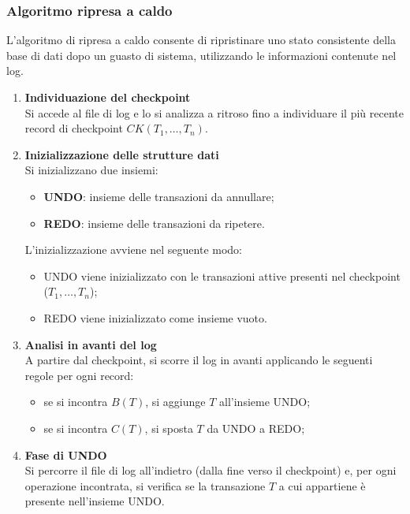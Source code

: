 \subsubsection{Algoritmo ripresa a caldo}

L'algoritmo di ripresa a caldo consente di ripristinare uno stato consistente della base di dati dopo un guasto di sistema, utilizzando le informazioni contenute nel log.

\begin{enumerate}
	\item \textbf{Individuazione del checkpoint} \\
	Si accede al file di log e lo si analizza a ritroso fino a individuare il più recente record di checkpoint $CK(T_1, \dots, T_n)$.
	
	\item \textbf{Inizializzazione delle strutture dati} \\
	Si inizializzano due insiemi:
	\begin{itemize}
		\item \textbf{UNDO}: insieme delle transazioni da annullare;
		\item \textbf{REDO}: insieme delle transazioni da ripetere.
	\end{itemize}
	
	L'inizializzazione avviene nel seguente modo:
	\begin{itemize}
		\item UNDO viene inizializzato con le transazioni attive presenti nel checkpoint ($T_1, \dots, T_n$);
		\item REDO viene inizializzato come insieme vuoto.
	\end{itemize}
	
	\item \textbf{Analisi in avanti del log} \\
	A partire dal checkpoint, si scorre il log in avanti applicando le seguenti regole per ogni record:
	\begin{itemize}
		\item se si incontra $B(T)$, si aggiunge $T$ all'insieme UNDO;
		\item se si incontra $C(T)$, si sposta $T$ da UNDO a REDO;
	\end{itemize}
	
\item \textbf{Fase di UNDO} \\
Si percorre il file di log all'indietro (dalla fine verso il checkpoint) e, per ogni operazione incontrata, si verifica se la transazione $T$ a cui appartiene è presente nell'insieme UNDO.


\end{enumerate}
